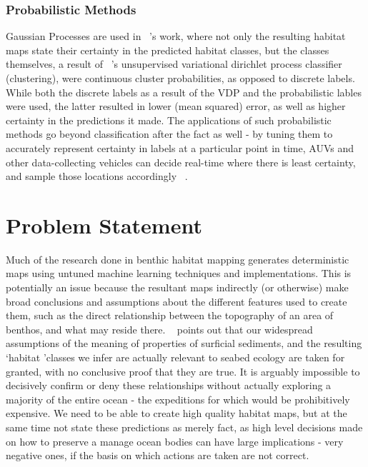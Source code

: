 \documentclass[journal]{IEEEtran}
\begin{document}
    \subsubsection{Probabilistic Methods}

    Gaussian Processes are used in ~\citet{bender12}'s work, where not only the resulting habitat maps state their certainty in the predicted habitat classes, but the classes themselves, a result of ~\citet{steinberg11}'s unsupervised variational dirichlet process classifier (clustering), were continuous cluster probabilities, as opposed to discrete labels. While both the discrete labels as a result of the VDP and the probabilistic lables were used, the latter resulted in lower (mean squared) error, as well as higher certainty in the predictions it made. The applications of such probabilistic methods go beyond classification after the fact as well - by tuning them to accurately represent certainty in labels at a particular point in time, AUVs and other data-collecting vehicles can decide real-time where there is least certainty, and sample those locations accordingly ~\citep{rigby10}.

    \section{Problem Statement}

    Much of the research done in benthic habitat mapping generates deterministic maps using untuned machine learning techniques and implementations. This is potentially an issue  because the resultant maps indirectly (or otherwise) make broad conclusions and assumptions about the different features used to create them, such as the direct relationship between the topography of an area of benthos, and what may reside there. ~\citet{kostylev12} points out that our widespread assumptions of the meaning of properties of surficial sediments, and the resulting \lq habitat \rq classes we infer are actually relevant to seabed ecology are taken for granted, with no conclusive proof that they are true. It is arguably impossible to decisively confirm or deny these relationships without actually exploring a majority of the entire ocean - the expeditions for which would be prohibitively expensive. We need to be able to create high quality habitat maps, but at the same time not state these predictions as merely fact, as high level decisions made on how to preserve a manage ocean bodies can have large implications - very negative ones, if the basis on which actions are taken are not correct.
\end{document}
